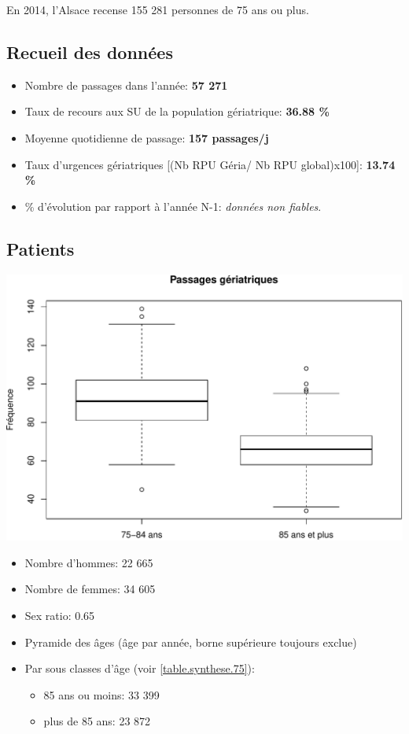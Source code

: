 \documentclass[]{article}
\begin{document}
En 2014, l'Alsace recense 155 281 personnes de 75 ans ou plus.

\subsection{Recueil des données}\label{recueil-des-donnees-2}

\begin{itemize}
\itemsep1pt\parskip0pt
\item
  Nombre de passages dans l'année: \textbf{57 271}
\item
  Taux de recours aux SU de la population gériatrique: \textbf{36.88 \%}
\item
  Moyenne quotidienne de passage: \textbf{157 passages/j}
\item
  Taux d'urgences gériatriques {[}(Nb RPU Géria/ Nb RPU global)x100{]}:
  \textbf{13.74 \%}
\item
  \% d'évolution par rapport à l'année N-1: \emph{données non fiables}.
\end{itemize}

\subsection{Patients}\label{patients-2}

\includegraphics{rapport2014_V4_files/figure-latex/sexe75-1.pdf}

\begin{itemize}
\item
  Nombre d'hommes: 22 665
\item
  Nombre de femmes: 34 605
\item
  Sex ratio: 0.65
\item
  Pyramide des âges (âge par année, borne supérieure toujours exclue)
\item
  Par sous classes d'âge (voir \ref{table.synthese.75}):

  \begin{itemize}
  \itemsep1pt\parskip0pt
  \item
    85 ans ou moins: 33 399
  \item
    plus de 85 ans: 23 872
  \end{itemize}
\end{itemize}
\end{document}
